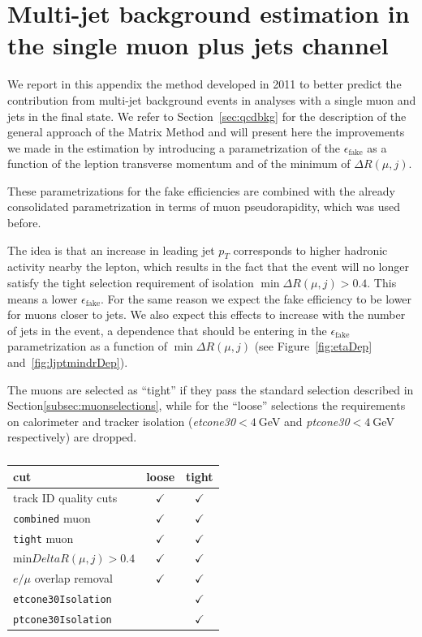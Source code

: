 \clearpage{\pagestyle{empty}\cleardoublepage}

\chapter{Multi-jet background estimation in the single muon plus jets channel}\label{app:qcdmm}

We report in this appendix the method developed in 2011 to better predict
the contribution from multi-jet background events in analyses with a single
muon and jets in the final state. We refer to Section~\ref{sec:qcdbkg}
for the description of the general approach of the
Matrix Method and will present here the improvements we
made in the estimation by introducing a parametrization of
the $\epsilon_\mathrm{fake}$ as a function of the leption
transverse momentum and of the minimum of $\Delta R(\mu,j)$.

These parametrizations for the fake efficiencies 
are combined with the already consolidated parametrization
in terms of muon pseudorapidity, which was used before.

The idea is that an increase in leading jet $p_T$ corresponds 
to higher hadronic activity nearby the lepton, 
which results in the fact that the event will no 
longer satisfy the tight selection requirement of 
isolation $\min\Delta R(\mu,j)>0.4$. This means a lower 
$\epsilon_\mathrm{fake}$. For the same reason we expect 
the fake efficiency to be lower for muons closer to jets.
We also expect this effects to increase with the number of 
jets in the event, a dependence that should be entering
in the $\epsilon_\mathrm{fake}$ parametrization as a function
of $\min\Delta R(\mu,j)$ (see Figure~\ref{fig:etaDep} and~\ref{fig:ljptmindrDep}). 

The muons are selected as ``tight'' if they pass the standard selection described in Section\ref{subsec:muonselections}, while for the ``loose'' selections the requirements on calorimeter and tracker isolation (\textit{etcone30}$<4~$GeV and \textit{ptcone30}$<4~$GeV respectively)   are dropped.

\begin{table}[htb]\centering
\begin{tabular}{lcc}
cut & loose & tight \\\midrule
track ID quality cuts & $\checkmark$ & $\checkmark$\\
\texttt{combined} muon & $\checkmark$ & $\checkmark$\\
\texttt{tight} muon & $\checkmark$ & $\checkmark$\\
min$Delta R(\mu,j)>0.4$ & $\checkmark$ & $\checkmark$\\
$e/\mu$ overlap removal& $\checkmark$ & $\checkmark$\\
\texttt{etcone30Isolation} &  & $\checkmark$\\
\texttt{ptcone30Isolation} &  & $\checkmark$\\\bottomrule
\end{tabular}
\caption{}\label{tab:}
\end{table}


